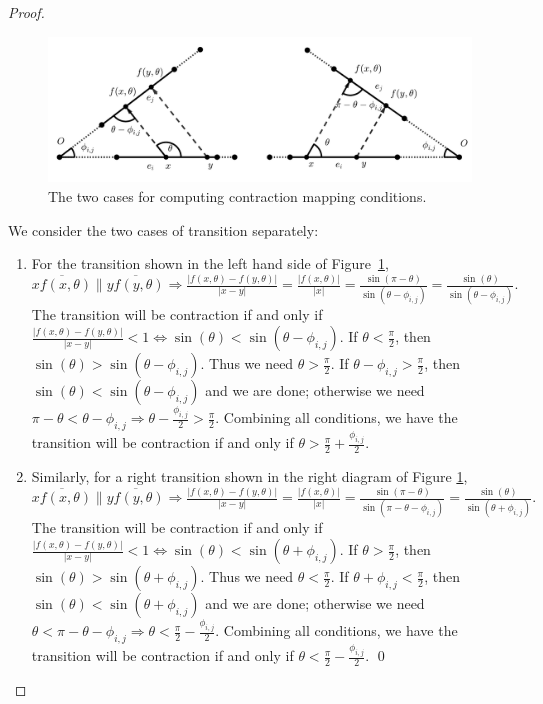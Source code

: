 \documentclass[sageh,times,Review]{sagej}
\begin{document}
\begin{proof}

\begin{figure}
    \includegraphics[width=0.9\columnwidth]{contraction_map_cond.pdf}
    \centering
    \caption{The two cases for computing contraction mapping conditions. \label{fig:cont_map}}
    \centering
\end{figure}

We consider the two cases of transition separately:
\begin{enumerate}
    \item For the transition shown in the left hand side of Figure~\ref{fig:cont_map}, 
          $\overline{xf(x, \theta)} \parallel \overline{yf(y, \theta)} \Rightarrow \frac{|f(x, \theta)-f(y, \theta)|}{|x-y|} = \frac{|f(x, \theta)|}{|x|} = \frac{\sin(\pi - \theta)}{\sin(\theta - \phi_{i, j})} = \frac{\sin(\theta)}{\sin(\theta-\phi_{i, j})}.$ The transition will be contraction if and only if $\frac{|f(x, \theta)-f(y, \theta)|}{|x-y|} < 1 \iff \sin(\theta)<\sin(\theta-\phi_{i, j})$. If $\theta < \frac{\pi}{2}$, then $\sin(\theta) > \sin(\theta-\phi_{i, j})$. Thus we need $\theta>\frac{\pi}{2}$. If $\theta-\phi_{i, j} > \frac{\pi}{2}$, then $\sin(\theta) < \sin(\theta-\phi_{i, j})$ and we are done; otherwise we need $\pi - \theta < \theta-\phi_{i, j} \Rightarrow \theta - \frac{\phi_{i, j}}{2} > \frac{\pi}{2}$. Combining all conditions, we have the transition will be contraction if and only if $\theta >\frac{\pi}{2} + \frac{\phi_{i, j}}{2}$.
    \item Similarly, for a right transition shown in the right diagram of
Figure \ref{fig:cont_map},
$\overline{xf(x, \theta)} \parallel \overline{yf(y, \theta)} \Rightarrow \frac{|f(x, \theta)-f(y, \theta)|}{|x-y|} = \frac{|f(x, \theta)|}{|x|} = \frac{\sin(\pi - \theta)}{\sin(\pi -\theta-\phi_{i, j})} = \frac{\sin(\theta)}{\sin(\theta + \phi_{i, j})}.$
The transition will be contraction if and only if
$\frac{|f(x, \theta)-f(y, \theta)|}{|x-y|} < 1 \iff \sin(\theta)<\sin(\theta+\phi_{i, j})$.
If $\theta > \frac{\pi}{2}$, then $\sin(\theta) > \sin(\theta + \phi_{i, j})$.
Thus we need $\theta<\frac{\pi}{2}$. If $\theta+\phi_{i, j} < \frac{\pi}{2}$,
then $\sin(\theta) < \sin(\theta+\phi_{i, j})$ and we are done; otherwise we
need
$\theta < \pi-\theta-\phi_{i, j} \Rightarrow \theta < \frac{\pi}{2} - \frac{\phi_{i, j}}{2}$.
Combining all conditions, we have the transition will be contraction if and only
if $\theta <\frac{\pi}{2} - \frac{\phi_{i, j}}{2}$. \qed
\end{enumerate}
\end{proof}
\end{document}
